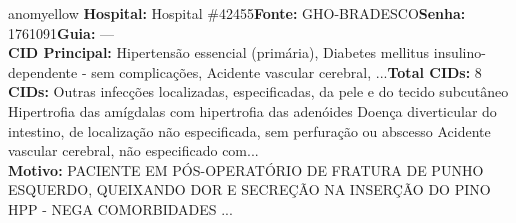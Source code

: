 \documentclass[a4paper,10pt]{article}
\begin{document}
\begin{anomalycard}[Interna\c{c}\~{a}o \#118422 | Pac. \#63282 | MODERADO (z=2.16) | LOS: 1d | 24/02/2026\,$\to$\,25/02/2026]{anomyellow}
\textbf{Hospital:} Hospital \#42455\quad \textbf{Fonte:} GHO-BRADESCO\quad \textbf{Senha:} 1761091\quad \textbf{Guia:} ---\\

\textbf{CID Principal:} {\small Hipertensão essencial (primária), Diabetes mellitus insulino-dependente - sem complicações, Acidente vascular cerebral, ...}\quad\textbf{Total CIDs:} 8\\

\textbf{CIDs:} {\scriptsize Outras infecções localizadas, especificadas, da pele e do tecido subcutâneo \textbar{} Hipertrofia das amígdalas com hipertrofia das adenóides \textbar{} Doença diverticular do intestino, de localização não especificada, sem perfuração ou abscesso \textbar{} Acidente vascular cerebral, não especificado com...}\\

\textbf{Motivo:} {\scriptsize PACIENTE EM PÓS-OPERATÓRIO DE FRATURA DE PUNHO ESQUERDO, QUEIXANDO DOR E SECREÇÃO NA INSERÇÃO DO PINO   HPP - NEGA COMORBIDADES ...}\\




\end{anomalycard}
\end{document}
